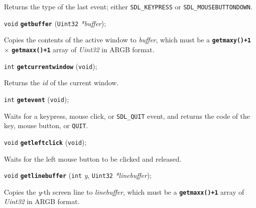 \documentclass[a4paper,12pt]{article}
\newcommand{\V}{\texttt{void}}      %
\newcommand{\I}{\texttt{int}}       %
\newcommand{\Ut}{\texttt{Uint32}}   %
\newcommand{\func}[1]{\textbf{\texttt{#1}}}  %
\newcommand{\A}[1]{\emph{#1}}       %
\newcommand{\T}[1]{\texttt{#1}}     %
\newenvironment{bgi}
{ %
  \begin{snugshade}
}
{ %
  \end{snugshade}
}
\begin{document}
Returns the type of the last event; either \T{SDL\_KEYPRESS} or
\T{SDL\_MOUSEBUTTONDOWN}.


\label{sec:getbuffer}

\begin{bgi}
\V{} \func{getbuffer} (\Ut{} \A{*buffer});
\end{bgi}

Copies the contents of the active window to \A{buffer}, which must be
a \func{getmaxy()+1} $\times$ \func{getmaxx()+1} array of \A{Uint32}
in ARGB format.


\label{sec:getcurrentwindow}

\begin{bgi}
\I{} \func{getcurrentwindow} (\V{});
\end{bgi}

Returns the \A{id} of the current window.


\label{sec:getevent}

\begin{bgi}
\I{} \func{getevent} (\V{});
\end{bgi}

Waits for a keypress, mouse click, or \T{SDL\_QUIT} event, and returns
the code of the key, mouse button, or \T{QUIT}.


\label{sec:getleftclick}

\begin{bgi}
\V{} \func{getleftclick} (\V{});
\end{bgi}

Waits for the left mouse button to be clicked and released.


\label{sec:getlinebuffer}

\begin{bgi}
\V{} \func{getlinebuffer} (\I{} \A{y}, \Ut{} \A{*linebuffer});
\end{bgi}

Copies the \A{y}-th screen line to \A{linebuffer}, which must be a
\func{getmaxx()+1} array of \A{Uint32} in ARGB format.
\end{document}
